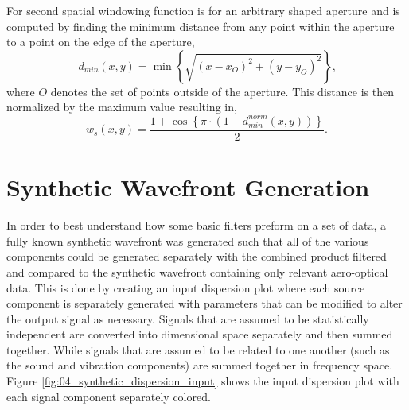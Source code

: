 For second spatial windowing function is for an arbitrary shaped aperture and is computed by finding the minimum distance from any point within the aperture to a point on the edge of the aperture,
\begin{equation}
 d_{min}(x,y) = \min\left\{\sqrt{(x-x_{O})^2+(y-y_{O})^2}\right\} \textrm{,}
 \label{eqn:04_window_space_arb_dist}
\end{equation}
where $O$ denotes the set of points outside of the aperture.
This distance is then normalized by the maximum value resulting in,
\begin{equation}
 w_s(x,y) = \frac{1+\cos\left\{\pi\cdot\left(1-d_{min}^{norm}(x,y)\right)\right\}}{2} \textrm{.}
 \label{eqn:04_window_space_arb}
\end{equation}

\section{Synthetic Wavefront Generation}
In order to best understand how some basic filters preform on a set of data, a fully known synthetic wavefront was generated such that all of the various components could be generated separately with the combined product filtered and compared to the synthetic wavefront containing only relevant aero-optical data.
This is done by creating an input dispersion plot where each source component is separately generated with parameters that can be modified to alter the output signal as necessary.
Signals that are assumed to be statistically independent are converted into dimensional space separately and then summed together.
While signals that are assumed to be related to one another (such as the sound and vibration components) are summed together in frequency space.
Figure \ref{fig:04_synthetic_dispersion_input} shows the input dispersion plot with each signal component separately colored.
